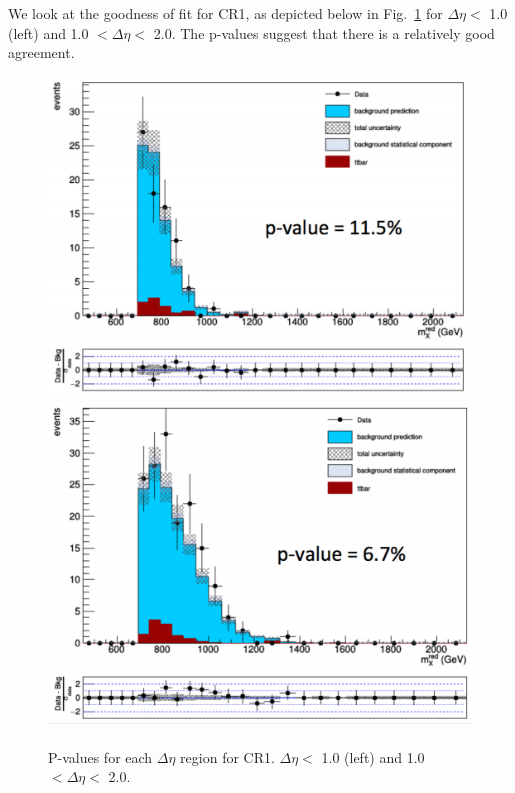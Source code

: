 We look at the goodness of fit for CR1, as depicted below in Fig.~\ref{fig:pvalCR1} for $\Delta\eta <$ 1.0 (left) and 1.0 $< \Delta\eta <$ 2.0. The p-values suggest that there is a relatively good agreement.
\begin{figure}[thb!]
\begin{center}
\includegraphics[scale=0.25]{Figures/CR1PVALdeta0.pdf}
\includegraphics[scale=0.25]{Figures/CR1PVALdeta1.pdf}
\end{center}
\caption{P-values for each $\Delta\eta$ region for CR1. $\Delta\eta <$ 1.0 (left) and 1.0 $< \Delta\eta <$ 2.0.}
\label{fig:pvalCR1}
\end{figure}

